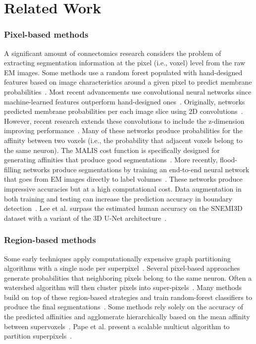 
\section{Related Work}

\subsubsection{Pixel-based methods}
A significant amount of connectomics research considers the problem of extracting segmentation information at the pixel (i.e., voxel) level from the raw EM images. 
Some methods use a random forest populated with hand-designed features based on image characteristics around a given pixel to predict membrane probabilities~\cite{kaynig2015large}.
Most recent advancements use convolutional neural networks since machine-learned features outperform hand-designed ones~\cite{bogovic2013learned}.
Originally, networks predicted membrane probabilities per each image slice using 2D convolutions~\cite{seymour2016rhoananet,ronneberger2015u,ciresan2012deep,jain2010boundary,kaynig2015large,amelio_segmentation}.
However, recent research extends these convolutions to include the z-dimension improving performance~\cite{lee2015recursive,parag2017anisotropic,cciccek20163d,turaga2010convolutional}.
Many of these networks produce probabilities for the affinity between two voxels (i.e., the probability that adjacent voxels belong to the same neuron). 
The MALIS cost function is specifically designed for generating affinities that produce good segmentations~\cite{briggman2009maximin}. 
More recently, flood-filling networks produce segmentations by training an end-to-end neural network that goes from EM images directly to label volumes~\cite{januszewski2016flood}. 
These networks produce impressive accuracies but at a high computational cost.
Data augmentation in both training and testing can increase the prediction accuracy in boundary detection~\cite{zeng2017deepem3d}.
Lee et al. surpass the estimated human accuracy on the SNEMI3D dataset with a variant of the 3D U-Net architecture~\cite{lee2017superhuman}.

\subsubsection{Region-based methods}

Some early techniques apply computationally expensive graph partitioning algorithms with a single node per superpixel~\cite{andres2012globally}. 
Several pixel-based approaches generate probabilities that neighboring pixels belong to the same neuron.
Often a watershed algorithm will then cluster pixels into super-pixels~\cite{zlateski2015image}.
Many methods build on top of these region-based strategies and train random-forest classifiers to produce the final segmentations~\cite{seymour2016rhoananet,nunez2014graph,parag2017anisotropic,zlateski2015image,10.1371/journal.pone.0125825}.
Some methods rely solely on the accuracy of the predicted affinities and agglomerate hierarchically based on the mean affinity between supervoxels~\cite{lee2017superhuman,funke2017deep}.
Pape et al. present a scalable multicut algorithm to partition superpixels~\cite{beier2017multicut}.

